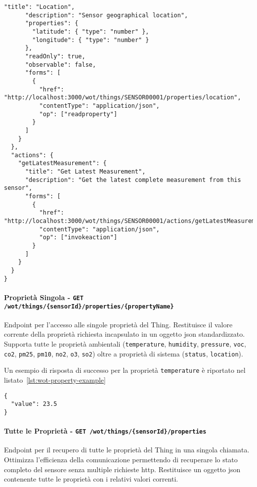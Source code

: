 \begin{lstlisting}[caption={Risposta di successo per endpoint \texttt{/wot/things/{sensorId}}}, label=lst:wot-thing-example]
      "title": "Location",
      "description": "Sensor geographical location",
      "properties": {
        "latitude": { "type": "number" },
        "longitude": { "type": "number" }
      },
      "readOnly": true,
      "observable": false,
      "forms": [
        {
          "href": "http://localhost:3000/wot/things/SENSOR00001/properties/location",
          "contentType": "application/json",
          "op": ["readproperty"]
        }
      ]
    }
  },
  "actions": {
    "getLatestMeasurement": {
      "title": "Get Latest Measurement",
      "description": "Get the latest complete measurement from this sensor",
      "forms": [
        {
          "href": "http://localhost:3000/wot/things/SENSOR00001/actions/getLatestMeasurement",
          "contentType": "application/json",
          "op": ["invokeaction"]
        }
      ]
    }
  }
}
\end{lstlisting}

\paragraph{Proprietà Singola - \texttt{GET /wot/things/\{sensorId\}/properties/\{propertyName\}}}

Endpoint per l'accesso alle singole proprietà del Thing.
Restituisce il valore corrente della proprietà richiesta incapsulato in un oggetto \acrshort{json} standardizzato.
Supporta tutte le proprietà ambientali (\texttt{temperature}, \texttt{humidity}, \texttt{pressure}, \texttt{voc},
\texttt{co2}, \texttt{pm25}, \texttt{pm10}, \texttt{no2}, \texttt{o3}, \texttt{so2}) oltre a proprietà di sistema
(\texttt{status}, \texttt{location}).

Un esempio di risposta di successo per la proprietà \texttt{temperature} è riportato
nel listato~\ref{lst:wot-property-example}
\begin{lstlisting}[caption={Risposta di successo per proprietà singola}, label=lst:wot-property-example]
{
  "value": 23.5
}
\end{lstlisting}

\paragraph{Tutte le Proprietà - \texttt{GET /wot/things/\{sensorId\}/properties}}

Endpoint per il recupero di tutte le proprietà del Thing in una singola chiamata.
Ottimizza l'efficienza della comunicazione permettendo di recuperare lo stato completo del sensore senza multiple
richieste \acrshort{http}. Restituisce un oggetto \acrshort{json} contenente tutte le proprietà con i relativi
valori correnti.

